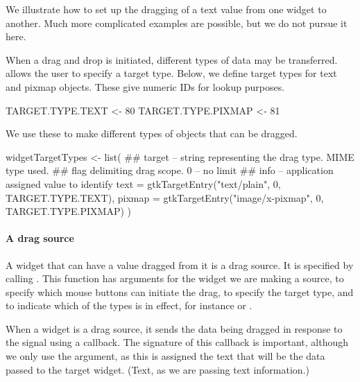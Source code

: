 We illustrate how to set up the dragging of a text value from one
widget to another. Much more complicated examples are possible, but we
do not pursue it here.

When a drag and drop is initiated, different types of data may be
transferred. \GTK\/ allows the user to specify a target type. Below,
we define target types for text and pixmap objects. These
give numeric IDs for lookup purposes.
\begin{Schunk}
\begin{Sinput}
 TARGET.TYPE.TEXT   <- 80                 
 TARGET.TYPE.PIXMAP <- 81                  
\end{Sinput}
\end{Schunk}
We use these to make different types of objects that can be dragged.
\begin{Schunk}
\begin{Sinput}
 widgetTargetTypes <- list(
 ## target -- string representing the drag type. MIME type used.
 ## flag delimiting drag scope. 0 -- no limit
 ## info -- application assigned value to identify
 text = gtkTargetEntry("text/plain", 0, TARGET.TYPE.TEXT),
 pixmap = gtkTargetEntry("image/x-pixmap", 0, TARGET.TYPE.PIXMAP)
 )
\end{Sinput}
\end{Schunk}

\paragraph{A drag source}
A widget that can have a value dragged from it is a drag source. It is
specified by calling
. This function has arguments
 for the widget we are making a
source,   to specify
which mouse buttons can initiate the drag,
 to specify the target type, and
 to indicate which of the
 types is in effect, for instance  or
. 

When a widget is a drag source, it sends the data being dragged in
response to the  signal using a callback. The
signature of this callback is important, although we only use the
 argument, as this is assigned the text that will be the
data passed to the target widget. (Text, as we are passing text
information.)

